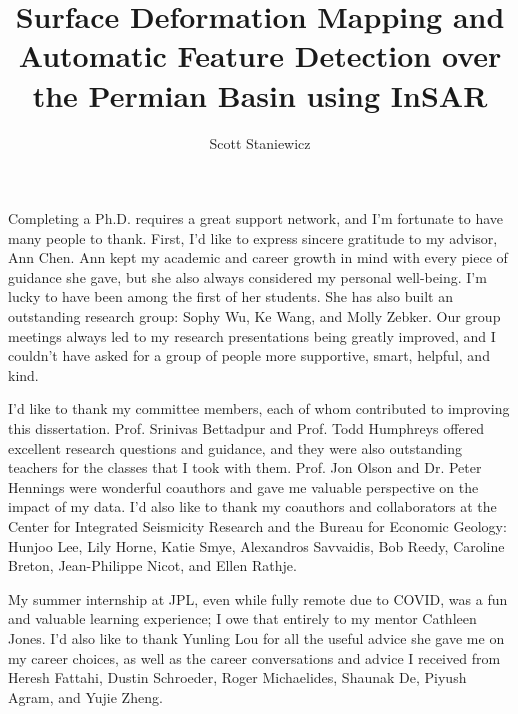 \documentclass{utexasthesis}
\title{Surface Deformation Mapping and Automatic Feature Detection over the Permian Basin using InSAR}
\author{Scott Staniewicz}
\begin{document}
\maketitle

%


\begin{acknowledgments}

Completing a Ph.D. requires a great support network, and I'm fortunate to have many people to thank. First, I'd like to express sincere gratitude to my advisor, Ann Chen.  Ann kept my academic and career growth in mind with every piece of guidance she gave, but she also always considered my personal well-being. I'm lucky to have been among the first of her students. She has also built an outstanding research group: Sophy Wu, Ke Wang, and Molly Zebker. Our group meetings always led to my research presentations being greatly improved, and I couldn't have asked for a group of people more supportive, smart, helpful, and kind.

I'd like to thank my committee members, each of whom contributed to improving this dissertation. Prof. Srinivas Bettadpur and  Prof. Todd Humphreys offered excellent research questions and guidance, and they were also outstanding teachers for the classes that I took with them. Prof. Jon Olson and Dr. Peter Hennings were wonderful coauthors and gave me valuable perspective on the impact of my data.  I'd also like to thank my coauthors and collaborators at the Center for Integrated Seismicity Research and the Bureau for Economic Geology: Hunjoo Lee, Lily Horne, Katie Smye, Alexandros Savvaidis, Bob Reedy, Caroline Breton, Jean-Philippe Nicot, and Ellen Rathje.

My summer internship at JPL, even while fully remote due to COVID, was a fun and valuable learning experience; I owe that entirely to my mentor Cathleen Jones. I'd also like to thank Yunling Lou for all the useful advice she gave me on my career choices, as well as the career conversations and advice I received from Heresh Fattahi, Dustin Schroeder, Roger Michaelides, Shaunak De, Piyush Agram, and Yujie Zheng.


\end{acknowledgments}
\end{document}
